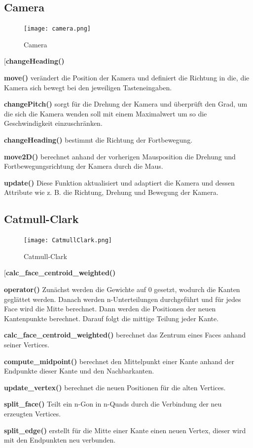 \subsection{Camera}

\begin{figure}[H]
\centering
\texttt{[image: camera.png]}
\caption{Camera}
\label{fig3}
\end{figure}

\begin{labeling}[]{[\textbf{changeHeading()}}%
\item[\textbf{move()}] verändert die Position der Kamera und definiert die Richtung in die, die Kamera sich bewegt bei den jeweiligen Tasteneingaben.
\item[\textbf{changePitch()}] sorgt für die Drehung der Kamera und überprüft den Grad, um die sich die Kamera wenden soll mit einem Maximalwert um so die Geschwindigkeit einzuschränken.
\item[\textbf{changeHeading()}] bestimmt die Richtung der Fortbewegung.
\item[\textbf{move2D()}] berechnet anhand der vorherigen Mausposition die Drehung und Fortbewegungsrichtung der Kamera durch die Maus.
\item[\textbf{update()}] Diese Funktion aktualisiert und adaptiert die Kamera und dessen Attribute wie z. B. die Richtung, Drehung und Bewegung der Kamera.
\end{labeling}

\subsection{Catmull-Clark}

\begin{figure}[H]
\centering
\texttt{[image: CatmullClark.png]}
\caption{Catmull-Clark}
\label{fig4}
\end{figure}

\begin{labeling}[]{[\textbf{calc\_face\_centroid\_weighted()}}%
\item[\textbf{operator()}] Zunächst werden die Gewichte auf 0 gesetzt, wodurch die Kanten geglättet werden. Danach werden n-Unterteilungen durchgeführt und für jedes Face wird die Mitte berechnet. Dann werden die Positionen der neuen Kantenpunkte berechnet. Darauf folgt die mittige Teilung jeder Kante.
\item[\textbf{calc\_face\_centroid\_weighted()}] berechnet das Zentrum eines Faces anhand seiner Vertices.
\item[\textbf{compute\_midpoint()}] berechnet den Mittelpunkt einer Kante anhand der Endpunkte dieser Kante und den Nachbarkanten.
\item[\textbf{update\_vertex()}] berechnet die neuen Positionen für die alten Vertices.
\item[\textbf{split\_face()}] Teilt ein n-Gon in n-Quads durch die Verbindung der neu erzeugten Vertices.
\item[\textbf{split\_edge()}] erstellt für die Mitte einer Kante einen neuen Vertex, dieser wird mit den Endpunkten neu verbunden.
\end{labeling}

